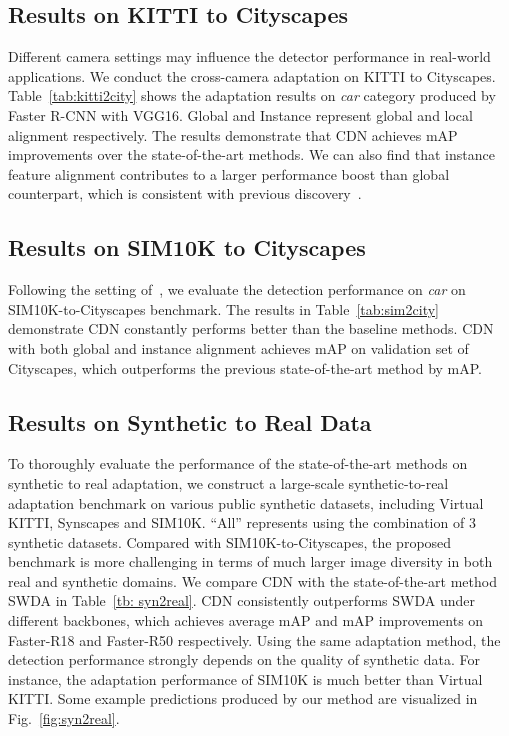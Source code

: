 \documentclass[runningheads]{llncs}
\begin{document}
\subsection{Results on KITTI to Cityscapes}
Different camera settings may influence the detector performance in real-world applications.
We conduct the cross-camera adaptation on KITTI to Cityscapes.
Table~\ref{tab:kitti2city} shows the adaptation results on \emph{car} category produced by Faster R-CNN with VGG16.
Global and Instance represent global and local alignment respectively.
The results demonstrate that CDN achieves  mAP improvements over the state-of-the-art methods.
We can also find that instance feature alignment contributes to a larger performance boost than global counterpart, which is consistent with previous discovery~\cite{Saito_2019_CVPR,Zhu_2019_CVPR}.





\subsection{Results on SIM10K to Cityscapes}
Following the setting of~\cite{Saito_2019_CVPR}, we evaluate the detection performance on \emph{car} on SIM10K-to-Cityscapes benchmark.
The results in Table~\ref{tab:sim2city} demonstrate CDN constantly performs better than the baseline methods.
CDN with both global and instance alignment achieves  mAP on validation set of Cityscapes, which outperforms the previous state-of-the-art method by  mAP.


\subsection{Results on Synthetic to Real Data} \label{sec:5-4}
To thoroughly evaluate the performance of the state-of-the-art methods on synthetic to real adaptation,
we construct a large-scale synthetic-to-real adaptation benchmark on various public synthetic datasets, including Virtual KITTI, Synscapes and SIM10K.
``All''  represents using the combination of 3 synthetic datasets.
Compared with SIM10K-to-Cityscapes, the proposed benchmark is more challenging in terms of much larger image diversity in both real and synthetic domains.
We compare CDN with the state-of-the-art method SWDA\cite{Saito_2019_CVPR}  in Table~\ref{tb: syn2real}.
CDN consistently outperforms SWDA under different backbones, which achieves average  mAP and  mAP improvements on Faster-R18 and Faster-R50 respectively.
Using the same adaptation method, the detection performance strongly depends on the quality of synthetic data.
For instance, the adaptation performance of SIM10K is much better than Virtual KITTI.
Some example predictions produced by our method are visualized in Fig.~\ref{fig:syn2real}.
\end{document}
